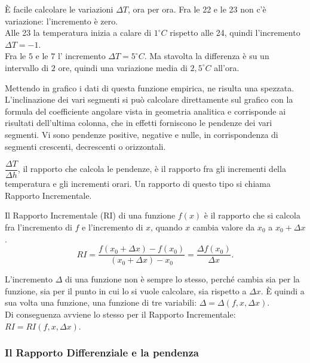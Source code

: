 \begin{esempio}
È facile calcolare le variazioni \(\Delta T\), ora per ora. 
Fra le 22 e le 23 non c'è variazione: l'incremento è zero. \\
Alle 23 la temperatura inizia a calare di \(1^\circ C\) 
rispetto alle 24, quindi l'incremento \( \Delta T=-1\). \\
Fra le \(5\) e le \(7\) l' incremento \(\Delta T= 5 ^\circ C\). 
Ma stavolta la differenza è su un intervallo di \(2\) ore, 
quindi una variazione media di \(2,5 ^\circ C\) all'ora.

Mettendo in grafico i dati di questa funzione empirica, ne risulta una 
spezzata. L'inclinazione dei vari segmenti si può calcolare direttamente sul 
grafico con la formula del coefficiente angolare vista in geometria analitica 
e corrisponde ai risultati dell'ultima colonna, che in effetti forniscono le 
pendenze dei vari segmenti.  Vi sono pendenze positive, negative e nulle, in 
corrispondenza di segmenti crescenti, decrescenti o orizzontali. 
\end{esempio}
 
\(\dfrac{\Delta T}{\Delta h}\), il rapporto che calcola le pendenze, è il 
rapporto fra gli incrementi della temperatura e gli incrementi orari. Un 
rapporto di questo tipo si chiama Rapporto Incrementale.
\begin{definizione}
Il Rapporto Incrementale (RI) di una funzione \(f(x)\) è il rapporto che 
si calcola fra l'incremento di \(f\) e l'incremento di \(x\), quando \(x\) 
cambia valore da \(x_0\) a \(x_0+\Delta x\).
\[
 RI= \frac{f(x_0+\Delta x)-f(x_0)}{(x_0+\Delta x)- x_0}=
 \frac{\Delta f(x_0)}{\Delta x}.
\]
\end{definizione}
L'incremento \(\Delta\) di una funzione non è sempre lo stesso, perché 
cambia sia per la funzione, sia per il punto in cui lo si vuole calcolare, 
sia rispetto a \(\Delta x\). 
È quindi a sua volta una funzione, una funzione di tre 
variabili: \(\Delta=\Delta(f, x, \Delta x)\). \\
Di conseguenza avviene lo stesso per il Rapporto Incrementale: \(RI=RI(f, x, 
\Delta x)\).

\subsubsection{Il Rapporto Differenziale e la pendenza}
\label{subsubsec:RD}

